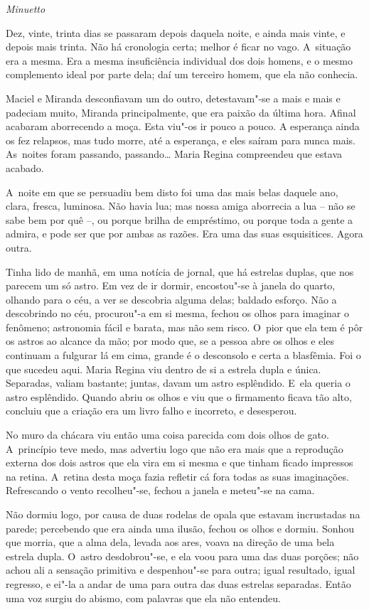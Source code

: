 \emph{Minuetto}

Dez, vinte, trinta dias se passaram depois daquela noite, e ainda mais
vinte, e depois mais trinta. Não há cronologia certa; melhor é ficar no
vago. A~situação era a mesma. Era a mesma insuficiência individual dos
dois homens, e o mesmo complemento ideal por parte dela; daí um terceiro
homem, que ela não conhecia.

Maciel e Miranda desconfiavam um do outro, detestavam"-se a mais e mais e
padeciam muito, Miranda principalmente, que era paixão da última hora.
Afinal acabaram aborrecendo a moça. Esta viu"-os ir pouco a pouco. A
esperança ainda os fez relapsos, mas tudo morre, até a esperança, e eles
saíram para nunca mais. As~noites foram passando, passando\ldots{} Maria
Regina compreendeu que estava acabado.

A~noite em que se persuadiu bem disto foi uma das mais belas daquele
ano, clara, fresca, luminosa. Não havia lua; mas nossa amiga aborrecia a
lua -- não se sabe bem por quê --, ou porque brilha de empréstimo, ou
porque toda a gente a admira, e pode ser que por ambas as razões. Era
uma das suas esquisitices. Agora outra.

Tinha lido de manhã, em uma notícia de jornal, que há estrelas duplas,
que nos parecem um só astro. Em vez de ir dormir, encostou"-se à janela
do quarto, olhando para o céu, a ver se descobria alguma delas; baldado
esforço. Não a descobrindo no céu, procurou"-a em si mesma, fechou os
olhos para imaginar o fenômeno; astronomia fácil e barata, mas não sem
risco. O~pior que ela tem é pôr os astros ao alcance da mão; por modo
que, se a pessoa abre os olhos e eles continuam a fulgurar lá em cima,
grande é o desconsolo e certa a blasfêmia. Foi o que sucedeu aqui. Maria
Regina viu dentro de si a estrela dupla e única. Separadas, valiam
bastante; juntas, davam um astro esplêndido. E~ela queria o astro
esplêndido. Quando abriu os olhos e viu que o firmamento ficava tão
alto, concluiu que a criação era um livro falho e incorreto, e
desesperou.

No muro da chácara viu então uma coisa parecida com dois olhos de gato.
A~princípio teve medo, mas advertiu logo que não era mais que a
reprodução externa dos dois astros que ela vira em si mesma e que tinham
ficado impressos na retina. A~retina desta moça fazia refletir cá fora
todas as suas imaginações. Refrescando o vento recolheu"-se, fechou a
janela e meteu"-se na cama.

Não dormiu logo, por causa de duas rodelas de opala que estavam
incrustadas na parede; percebendo que era ainda uma ilusão, fechou os
olhos e dormiu. Sonhou que morria, que a alma dela, levada aos ares,
voava na direção de uma bela estrela dupla. O~astro desdobrou"-se, e ela
voou para uma das duas porções; não achou ali a sensação primitiva e
despenhou"-se para outra; igual resultado, igual regresso, e ei"-la a
andar de uma para outra das duas estrelas separadas. Então uma voz
surgiu do abismo, com palavras que ela não entendeu.

